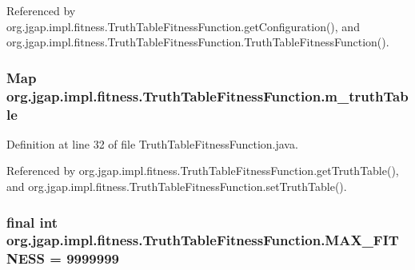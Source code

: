 Referenced by org.\-jgap.\-impl.\-fitness.\-Truth\-Table\-Fitness\-Function.\-get\-Configuration(), and org.\-jgap.\-impl.\-fitness.\-Truth\-Table\-Fitness\-Function.\-Truth\-Table\-Fitness\-Function().

\hypertarget{classorg_1_1jgap_1_1impl_1_1fitness_1_1_truth_table_fitness_function_a73ca12c6dd875b317bc3c316a48b447d}{
\subsubsection[{m\-\_\-truth\-Table}]{\setlength{\rightskip}{0pt plus 5cm}Map org.\-jgap.\-impl.\-fitness.\-Truth\-Table\-Fitness\-Function.\-m\-\_\-truth\-Table\hspace{0.3cm}{\ttfamily [private]}}}\label{classorg_1_1jgap_1_1impl_1_1fitness_1_1_truth_table_fitness_function_a73ca12c6dd875b317bc3c316a48b447d}


Definition at line 32 of file Truth\-Table\-Fitness\-Function.\-java.



Referenced by org.\-jgap.\-impl.\-fitness.\-Truth\-Table\-Fitness\-Function.\-get\-Truth\-Table(), and org.\-jgap.\-impl.\-fitness.\-Truth\-Table\-Fitness\-Function.\-set\-Truth\-Table().

\hypertarget{classorg_1_1jgap_1_1impl_1_1fitness_1_1_truth_table_fitness_function_ad89545f0c14a72e8ce9c5974d77f824a}{
\subsubsection[{M\-A\-X\-\_\-\-F\-I\-T\-N\-E\-S\-S}]{\setlength{\rightskip}{0pt plus 5cm}final int org.\-jgap.\-impl.\-fitness.\-Truth\-Table\-Fitness\-Function.\-M\-A\-X\-\_\-\-F\-I\-T\-N\-E\-S\-S = 9999999\hspace{0.3cm}{\ttfamily [static]}}}\label{classorg_1_1jgap_1_1impl_1_1fitness_1_1_truth_table_fitness_function_ad89545f0c14a72e8ce9c5974d77f824a}



